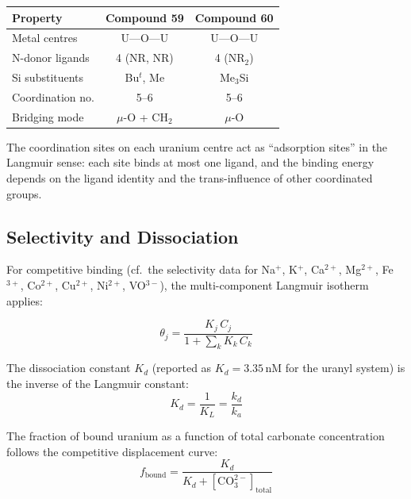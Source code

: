 \documentclass[11pt]{article}
\begin{document}
\begin{center}
\begin{tabular}{lcc}
\toprule
\textbf{Property} & \textbf{Compound 59} & \textbf{Compound 60} \\
\midrule
Metal centres     & U---O---U            & U---O---U            \\
N-donor ligands   & 4 (NR, NR)           & 4 (NR$_2$)           \\
Si substituents   & Bu$^t$, Me           & Me$_3$Si             \\
Coordination no.  & 5--6                 & 5--6                 \\
Bridging mode     & $\mu$-O + CH$_2$     & $\mu$-O              \\
\bottomrule
\end{tabular}
\end{center}

The coordination sites on each uranium centre act as ``adsorption
sites'' in the Langmuir sense:  each site binds at most one ligand,
and the binding energy depends on the ligand identity and the
trans-influence of other coordinated groups.

\subsection{Selectivity and Dissociation}

For competitive binding (cf.\ the selectivity data for Na$^+$, K$^+$,
Ca$^{2+}$, Mg$^{2+}$, Fe$^{3+}$, Co$^{2+}$, Cu$^{2+}$, Ni$^{2+}$,
VO$^{3-}$), the multi-component Langmuir isotherm applies:

\begin{equation}
  \theta_j = \frac{K_j\, C_j}{1 + \sum_{k} K_k\, C_k}
\end{equation}

The dissociation constant $K_d$ (reported as $K_d = 3.35$\,nM for the
uranyl system) is the inverse of the Langmuir constant:
\begin{equation}
  K_d = \frac{1}{K_L} = \frac{k_d}{k_a}
\end{equation}

The fraction of bound uranium as a function of total carbonate
concentration follows the competitive displacement curve:
\begin{equation}
  f_{\text{bound}} = \frac{K_d}{K_d + [\text{CO}_3^{2-}]_{\text{total}}}
\end{equation}

\end{document}
